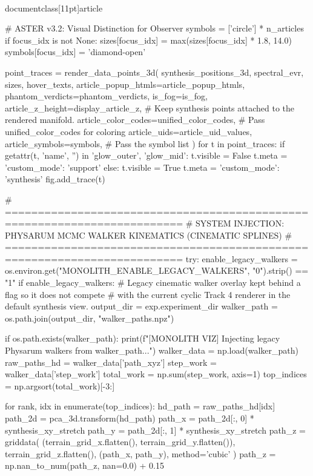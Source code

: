 \\documentclass[11pt]{article}
\begin{document}
\begin{CodeBlock}
{{{{{    # ASTER v3.2: Visual Distinction for Observer
    symbols = ['circle'] * n_articles
    if focus_idx is not None:
        sizes[focus_idx] = max(sizes[focus_idx] * 1.8, 14.0)
        symbols[focus_idx] = 'diamond-open'
        
    point_traces = render_data_points_3d(
        synthesis_positions_3d, spectral_evr, sizes, hover_texts,
        article_popup_htmls=article_popup_htmls,
        phantom_verdicts=phantom_verdicts, is_fog=is_fog,
        article_z_height=display_article_z, # Keep synthesis points attached to the rendered manifold.
        article_color_codes=unified_color_codes, # Pass unified_color_codes for coloring
        article_uids=article_uid_values,
        article_symbols=symbols, # Pass the symbol list
    )
    for t in point_traces:
        if getattr(t, 'name', '') in {'glow_outer', 'glow_mid'}:
            t.visible = False
            t.meta = {'custom_mode': 'support'}
        else:
            t.visible = True
            t.meta = {'custom_mode': 'synthesis'}
        fig.add_trace(t)

    # =========================================================================
    # SYSTEM INJECTION: PHYSARUM MCMC WALKER KINEMATICS (CINEMATIC SPLINES)
    # =========================================================================
    try:
        enable_legacy_walkers = os.environ.get("MONOLITH_ENABLE_LEGACY_WALKERS", "0").strip() == "1"
        if enable_legacy_walkers:
            # Legacy cinematic walker overlay kept behind a flag so it does not compete
            # with the current cyclic Track 4 renderer in the default synthesis view.
            output_dir = exp.experiment_dir
            walker_path = os.path.join(output_dir, "walker_paths.npz")

            if os.path.exists(walker_path):
                print(f"[MONOLITH VIZ] Injecting legacy Physarum walkers from {walker_path}...")
                walker_data = np.load(walker_path)
                raw_paths_hd = walker_data['path_xyz']
                step_work = walker_data['step_work']
                total_work = np.sum(step_work, axis=1)
                top_indices = np.argsort(total_work)[-3:]

                for rank, idx in enumerate(top_indices):
                    hd_path = raw_paths_hd[idx]
                    path_2d = pca_3d.transform(hd_path)
                    path_x = path_2d[:, 0] * synthesis_xy_stretch
                    path_y = path_2d[:, 1] * synthesis_xy_stretch
                    path_z = griddata(
                        (terrain_grid_x.flatten(), terrain_grid_y.flatten()),
                        terrain_grid_z.flatten(),
                        (path_x, path_y),
                        method='cubic'
                    )
                    path_z = np.nan_to_num(path_z, nan=0.0) + 0.15

}}}}}
\end{CodeBlock}
\end{document}
